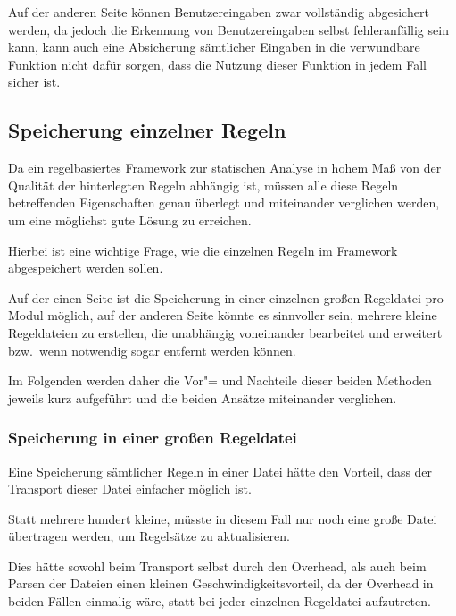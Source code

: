                 Auf der anderen Seite können Benutzereingaben zwar vollständig abgesichert werden,
                da jedoch die Erkennung von Benutzereingaben selbst fehleranfällig sein kann,
                kann auch eine Absicherung sämtlicher Eingaben in die verwundbare Funktion nicht dafür sorgen,
                dass die Nutzung dieser Funktion in jedem Fall sicher ist.

        \subsection{Speicherung einzelner Regeln}
            Da ein regelbasiertes Framework zur statischen Analyse in hohem Maß von der Qualität der hinterlegten Regeln abhängig ist,
            müssen alle diese Regeln betreffenden Eigenschaften genau überlegt und
            miteinander verglichen werden,
            um eine möglichst gute Lösung zu erreichen.

            Hierbei ist eine wichtige Frage,
            wie die einzelnen Regeln im Framework abgespeichert werden sollen.

            Auf der einen Seite ist die Speicherung in einer einzelnen großen Regeldatei pro Modul möglich,
            auf der anderen Seite könnte es sinnvoller sein,
            mehrere kleine Regeldateien zu erstellen,
            die unabhängig voneinander bearbeitet und
            erweitert bzw.\ wenn notwendig sogar entfernt werden können.

            Im Folgenden werden daher die Vor"= und
            Nachteile dieser beiden Methoden jeweils kurz aufgeführt und
            die beiden Ansätze miteinander verglichen.

            \subsubsection{Speicherung in einer großen Regeldatei}\label{Speicherung in einer grossen Regeldatei}
                Eine Speicherung sämtlicher Regeln in einer Datei hätte den Vorteil,
                dass der Transport dieser Datei einfacher möglich ist.

                Statt mehrere hundert kleine,
                müsste in diesem Fall nur noch eine große Datei übertragen werden,
                um Regelsätze zu aktualisieren.

                Dies hätte sowohl beim Transport selbst durch den Overhead,
                als auch beim Parsen der Dateien einen kleinen Geschwindigkeitsvorteil,
                da der Overhead in beiden Fällen einmalig wäre,
                statt bei jeder einzelnen Regeldatei aufzutreten.


